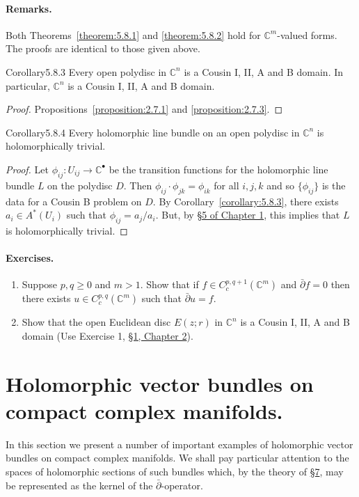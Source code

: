 \paragraph{Remarks.} Both Theorems~\ref{theorem:5.8.1} and \ref{theorem:5.8.2} hold for $\mathbb C^m$-valued forms. The proofs are identical to those given above.
\begin{originaltheorem}{Corollary}{5.8.3}
Every open polydisc in $\mathbb C^n$ is a Cousin I, II, A and B domain. In particular, $\mathbb C^n$ is a Cousin I, II, A and B domain.
\end{originaltheorem}
\begin{proof} Propositions~\ref{proposition:2.7.1} and \ref{proposition:2.7.3}. \end{proof}
\begin{originaltheorem}{Corollary}{5.8.4}
Every holomorphic line bundle on an open polydisc in $\mathbb C^n$ is holomorphically trivial.
\end{originaltheorem}
\begin{proof}
Let $\phi_{ij}:U_{ij}\to\mathbb C^\bullet$ be the transition functions for the holomorphic line bundle $L$ on the polydisc $D$. Then $\phi_{ij}\cdot\phi_{jk}=\phi_{ik}$ for all $i,j,k$ and so $\{\phi_{ij}\}$ is the data for a Cousin B problem on $D$. By Corollary~\ref{corollary:5.8.3}, there exists $a_i\in A^*(U_i)$ such that $\phi_{ij}=a_j/a_i$. But, by \hyperref[sec:1:5]{\S5 of Chapter 1}, this implies that $L$ is holomorphically trivial.
\end{proof}
\paragraph{Exercises.}
\begin{enumerate}
\item Suppose $p,q\geq0$ and $m>1$. Show that if $f\in C_c^{p,q+1}(\mathbb C^m)$ and $\bar\partial f=0$ then there exists $u\in C_c^{p,q}(\mathbb C^m)$ such that $\bar\partial u=f$.
\item Show that the open Euclidean disc $E(z;r)$ in $\mathbb C^n$ is a Cousin I, II, A and B domain (Use Exercise 1, \hyperref[sec:2:1]{\S1, Chapter 2}).
\end{enumerate}
\section{Holomorphic vector bundles on compact complex manifolds.}\label{sec:5:9}
In this section we present a number of important examples of holomorphic vector bundles on compact complex manifolds. We shall pay particular attention to the spaces of holomorphic sections of such bundles which, by the theory of \hyperref[sec:5:7]{\S7}, may be represented as the kernel of the $\bar\partial$-operator.

